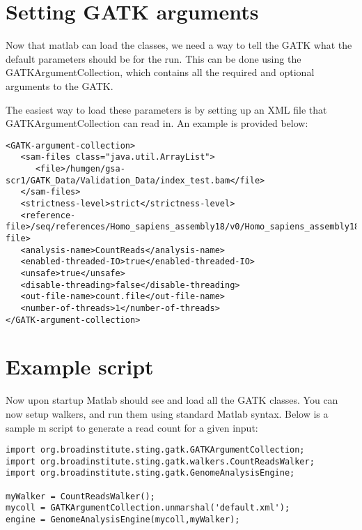 \documentclass[11pt]{article}
\begin{document}
\section{Setting GATK arguments}
Now that matlab can load the classes, we need a way to tell the GATK what the default parameters should be for the run.  This can be done using the GATKArgumentCollection, which contains all the required and optional arguments to the GATK.  

The easiest way to load these parameters is by setting up an XML file that GATKArgumentCollection can read in.  An example is provided below:
\lstset{caption=default.xml, frame=lines, label=MthodNames,basicstyle= \tiny}
\lstset{tabsize=4}
\begin{lstlisting}
<GATK-argument-collection>
   <sam-files class="java.util.ArrayList">
      <file>/humgen/gsa-scr1/GATK_Data/Validation_Data/index_test.bam</file>
   </sam-files>
   <strictness-level>strict</strictness-level>
   <reference-file>/seq/references/Homo_sapiens_assembly18/v0/Homo_sapiens_assembly18.fasta</reference-file>
   <analysis-name>CountReads</analysis-name>
   <enabled-threaded-IO>true</enabled-threaded-IO>
   <unsafe>true</unsafe>
   <disable-threading>false</disable-threading>
   <out-file-name>count.file</out-file-name>
   <number-of-threads>1</number-of-threads>
</GATK-argument-collection>
\end{lstlisting}
\pagebreak
\section{Example script}
Now upon startup Matlab should see and load all the GATK classes. You can now setup walkers, and run them using standard Matlab syntax.  Below is a sample m script to generate a read count for a given input:
\lstset{caption=example.m, frame=lines, label=MthodNames,basicstyle=\tiny}
\lstset{tabsize=4}
\begin{lstlisting}
import org.broadinstitute.sting.gatk.GATKArgumentCollection;
import org.broadinstitute.sting.gatk.walkers.CountReadsWalker;
import org.broadinstitute.sting.gatk.GenomeAnalysisEngine;
 
myWalker = CountReadsWalker();
mycoll = GATKArgumentCollection.unmarshal('default.xml');
engine = GenomeAnalysisEngine(mycoll,myWalker);
\end{lstlisting}
\end{document}
